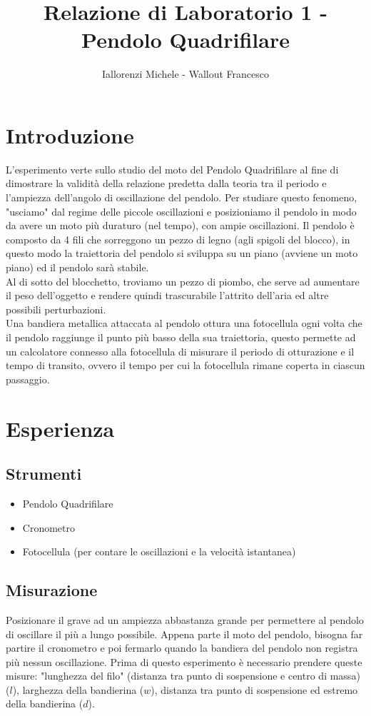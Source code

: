 \documentclass{article}
\title{Relazione di Laboratorio 1 - Pendolo Quadrifilare}
\author{Iallorenzi Michele - Wallout Francesco}
\begin{document}
\maketitle

\section{Introduzione}
    L'esperimento verte sullo studio del moto del Pendolo Quadrifilare al fine di dimostrare la validità della relazione predetta dalla teoria tra il periodo e l'ampiezza dell'angolo di oscillazione del pendolo. 
    Per studiare questo fenomeno, "usciamo" dal regime delle piccole oscillazioni e posizioniamo il pendolo in modo da avere un moto più duraturo (nel tempo), con ampie oscillazioni.
    Il pendolo è composto da 4 fili che sorreggono un pezzo di legno (agli spigoli del blocco), in questo modo la traiettoria del pendolo si sviluppa su un piano (avviene un moto piano) ed il pendolo sarà stabile.\\
    Al di sotto del blocchetto, troviamo un pezzo di piombo, che serve ad aumentare il peso dell'oggetto e rendere quindi trascurabile l'attrito dell'aria ed altre possibili perturbazioni.\\
    Una bandiera metallica attaccata al pendolo ottura una fotocellula ogni volta
    che il pendolo raggiunge il punto più basso della sua traiettoria, questo permette
    ad un calcolatore connesso alla fotocellula di misurare il periodo di otturazione e il
    tempo di transito, ovvero il tempo per cui la fotocellula rimane coperta in ciascun
    passaggio.
    
\section{Esperienza}

    \subsection{Strumenti}
    \begin{itemize}
        \item Pendolo Quadrifilare
        \item Cronometro
        \item Fotocellula (per contare le oscillazioni e la velocità istantanea)
    \end{itemize}
    
    \subsection{Misurazione}
    Posizionare il grave ad un ampiezza abbastanza grande per permettere al pendolo di oscillare il più a lungo possibile. Appena parte il moto del pendolo, bisogna far partire il cronometro e poi fermarlo quando la bandiera del pendolo non registra più nessun oscillazione.
    Prima di questo esperimento è necessario prendere queste misure: "lunghezza del filo" (distanza tra punto di sospensione e centro di massa) ($l$), larghezza della bandierina ($w$), distanza tra punto di sospensione ed estremo della bandierina ($d$).
    
\end{document}
